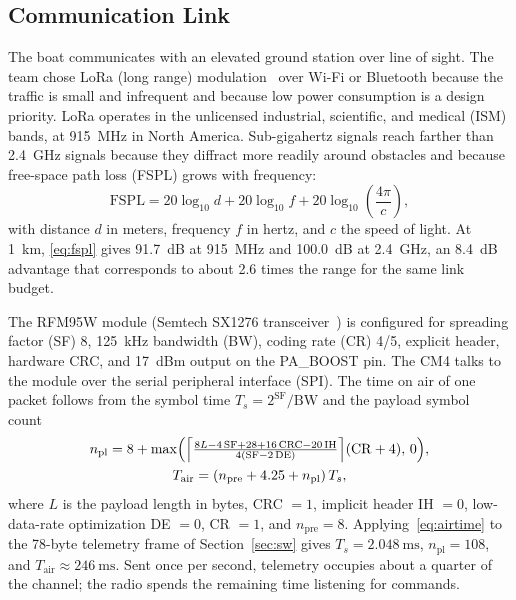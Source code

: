 \subsection{Communication Link}
The boat communicates with an elevated ground station over line of sight. The
team chose LoRa (long range) modulation~\cite{augustin2016} over Wi-Fi or
Bluetooth because the traffic is small and infrequent and because low power
consumption is a design priority. LoRa operates in the unlicensed industrial,
scientific, and medical (ISM) bands, at \SI{915}{\mega\hertz} in North
America. Sub-gigahertz signals reach farther than \SI{2.4}{\giga\hertz}
signals because they diffract more readily around obstacles and because
free-space path loss (FSPL) grows with frequency:
\begin{equation}
\mathrm{FSPL} = 20\log_{10} d + 20\log_{10} f + 20\log_{10}\!\left(\frac{4\pi}{c}\right),
\label{eq:fspl}
\end{equation}
with distance $d$ in meters, frequency $f$ in hertz, and $c$ the speed of
light. At \SI{1}{\kilo\meter}, \eqref{eq:fspl} gives \SI{91.7}{dB} at
\SI{915}{\mega\hertz} and \SI{100.0}{dB} at \SI{2.4}{\giga\hertz}, an
\SI{8.4}{dB} advantage that corresponds to about 2.6 times the range for the
same link budget.

The RFM95W module (Semtech SX1276 transceiver~\cite{sx1276}) is configured for
spreading factor (SF) 8, \SI{125}{\kilo\hertz} bandwidth (BW), coding rate (CR) 4/5,
explicit header, hardware CRC, and \SI{17}{dBm} output on the PA\_BOOST pin. The CM4 talks to the module over the serial peripheral interface (SPI).
The time on air of one packet follows from the symbol time
$T_s = 2^{\mathrm{SF}}/\mathrm{BW}$ and the payload symbol
count~\cite{sx1276}
\begin{multline}
n_{\mathrm{pl}} = 8 + \max\Bigl(\Bigl\lceil \tfrac{8L - 4\,\mathrm{SF} + 28 + 16\,\mathrm{CRC} - 20\,\mathrm{IH}}{4(\mathrm{SF} - 2\,\mathrm{DE})} \Bigr\rceil (\mathrm{CR}+4),\, 0\Bigr),\\
T_{\mathrm{air}} = (n_{\mathrm{pre}} + 4.25 + n_{\mathrm{pl}})\,T_s ,
\label{eq:airtime}
\end{multline}
where $L$ is the payload length in bytes, CRC $=1$, implicit header IH $=0$,
low-data-rate optimization DE $=0$, CR $=1$, and $n_{\mathrm{pre}} = 8$. Applying~\eqref{eq:airtime} to
the 78-byte telemetry frame of Section~\ref{sec:sw} gives $T_s =
\SI{2.048}{\milli\second}$, $n_{\mathrm{pl}} = 108$, and $T_{\mathrm{air}}
\approx \SI{246}{\milli\second}$. Sent once per second, telemetry occupies
about a quarter of the channel; the radio spends the remaining time listening
for commands.

